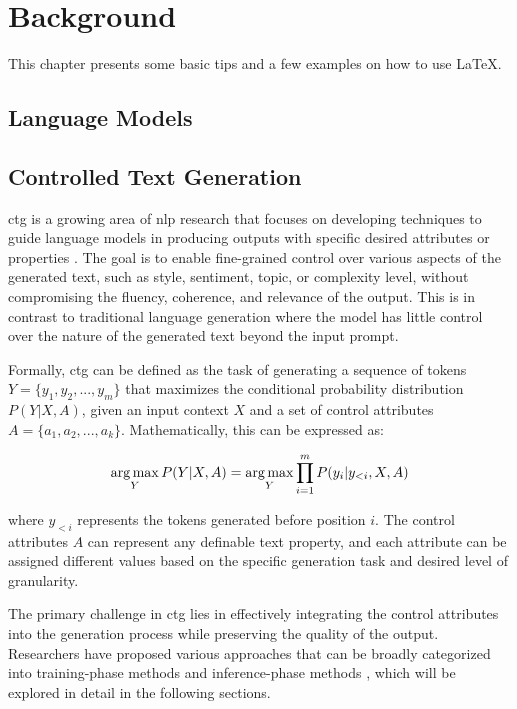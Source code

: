 \chapter{Background}
\label{c2}

This chapter presents some basic tips and a few examples on how to use \LaTeX.


\section{Language Models}
\label{c2:s:language-models}



\section{Controlled Text Generation}
\label{c2:s:controlled-text-generation}

\gls{ctg} is a growing area of \gls{nlp} research that focuses on developing techniques to guide language models in producing outputs with specific desired attributes or properties \cite{liang2024controllabletextgenerationlarge, keskar2019ctrlconditionaltransformerlanguage, dathathri2020plugplaylanguagemodels}.
The goal is to enable fine-grained control over various aspects of the generated text, such as style, sentiment, topic, or complexity level, without compromising the fluency, coherence, and relevance of the output. 
This is in contrast to traditional language generation where the model has little control over the nature of the generated text beyond the input prompt.

Formally, \gls{ctg} can be defined as the task of generating a sequence of tokens $Y = \{y_1, y_2, ..., y_m\}$ that maximizes the conditional probability distribution $P(Y|X, A)$, given an input context $X$ and a set of control attributes $A = \{a_1, a_2, ..., a_k\}$. 
Mathematically, this can be expressed as:

\begin{equation}
    \label{eq:controlled-generation}
    \operatorname*{arg\,max}_Y P(Y | X, A) = \operatorname*{arg\,max}_Y \prod_{i = 1}^{m} P(y_i | y_{<i}, X, A)
\end{equation}

where $y_{<i}$ represents the tokens generated before position $i$. 
The control attributes $A$ can represent any definable text property, and each attribute can be assigned different values based on the specific generation task and desired level of granularity.

The primary challenge in \gls{ctg} lies in effectively integrating the control attributes into the generation process while preserving the quality of the output. 
Researchers have proposed various approaches that can be broadly categorized into training-phase methods and inference-phase methods \cite{liang2024controllabletextgenerationlarge, he-etal-2022-ctrlsum}, which will be explored in detail in the following sections.

